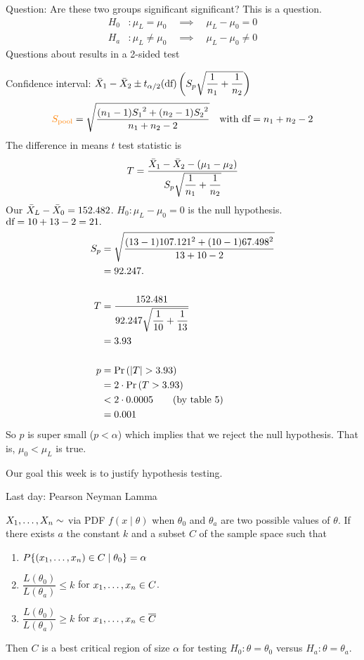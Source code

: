\nl Question: Are these two groups significant significant? This is a  question.
\begin{align*}
    H_0 &: \mu_L = \mu_0 \quad \implies \quad  \mu_L - \mu_0 = 0\\
    H_a &: \mu_L \neq \mu_0 \quad \implies \quad \mu_L - \mu_0 \neq 0
\end{align*}
Questions about  results in a 2-sided test

\nl Confidence interval: $\displaystyle \Xbar_1 - \Xbar_2 \pm t_{\alpha/2}(\df)\pars{S_p\sqrt{\dfrac{1}{n_1} + \dfrac{1}{n_2}}}$
$$\color{orange} S_{\text{pool}} \color{black} = \sqrt{\dfrac{(n_1-1){S_1}^2 + (n_2-1){S_2}^2}{n_1 + n_2 - 2}} \quad \text{with } \text{df} = n_1 + n_2 - 2$$
The difference in means $t$ test statistic is 
$$T = \dfrac{\Xbar_1 - \Xbar_2 - (\mu_1 - \mu_2)}{S_p \sqrt{\over*{n_1} + \over*{n_2}}}$$
Our $\bar{X}_L - \bar{X}_0 = 152.482$. $H_0 : \mu_L - \mu_0 = 0$ is the null hypothesis. $\text{df} = 10+13-2=21.$
\begin{align*}
    S_p &= \sqrt{\dfrac{(13-1)107.121^2 + (10-1)67.498^2 }{13+10-2}}\\
    &= 92.247.\\
    \\
    T &= \frac{152.481}{92.247 \sqrt{\over*{10} + \over*{13}}}\\
    &= 3.93
    \\\\p &= \P{|T|>3.93} \\ &= 2 \cdot \P{T > 3.93}\\ &< 2 \cdot 0.0005 \tag{by table 5}\\
    & = 0.001
\end{align*}
So $p$ is super small ($p < \alpha$) which implies that we reject the null hypothesis. That is, $\mu_0 < \mu_L$ is true.

\nnl Our goal this week is to justify hypothesis testing. 

\nl Last day: Pearson Neyman Lamma

\nl ${X}_1, \dots, {X}_n \sim$ via PDF $f(x \mid \theta)$ when $\theta_0$ and $\theta_a$ are two possible values of $\theta$. If there exists $a$ the constant $k$ and a subset $C$ of the sample space such that
\begin{enumerate}
    \item $P\{({x}_1, \dots, {x}_n) \in C \mid \theta_0\} = \alpha$
    \item $\dfrac{L(\theta_0)}{L(\theta_a)} \leq k$ for ${x}_1, \dots, {x}_n \in C$.
    \item $\dfrac{L(\theta_0)}{L(\theta_a)} \geq k$ for ${x}_1, \dots, {x}_n \in \overline{C}$
\end{enumerate}
Then $C$ is a best critical region of size $\alpha$ for testing $H_0 : \theta = \theta_0$ versus $H_a : \theta = \theta_a$.

